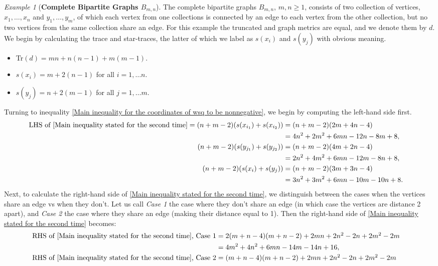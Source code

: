 \documentclass[12pt]{amsart}
\numberwithin{theorem}{section}
\theoremstyle{remark}
\newtheorem{example}[theorem]{Example}
\begin{document}
\vskip3mm
\begin{example}[{\bf Complete Bipartite Graphs $B_{m,n}$}]
The complete bipartite graphs $B_{m,n}$, $m,n\ge 1$, consists of two collection of vertices, $x_1,\dots, x_n$ and $y_1,\dots, y_m$, of which each vertex from one collections is connected by an edge to each vertex from the other collection, but no two vertices from the same collection share an edge. For this example the truncated and graph metrics are equal, and we denote them by $d$. We begin by calculating the trace and star-traces, the latter of which we label as $s(x_i)$ and $s(y_j)$ with obvious meaning. 
\begin{itemize}
\item[(i)] Tr$(d) = mn + n(n-1) + m(m-1)$. 
\item[(ii)] $s(x_i) = m + 2(n-1)$ for all $i=1,\dots n$. 
\item[\phantom{[ii]}] $s(y_j) = n + 2(m-1)$ for all $j=1,\dots m$.
\end{itemize} 
Turning to inequality \eqref{Main inequality for the coordinates of wsq to be nonnegative}, we begin by computing the left-hand side first. 
\begin{align*}
\text{LHS of \eqref{Main inequality stated for the second time}}=(n+m-2)(s(x_{i_1}) + s(x_{i_2})) & = (n+m-2)(2m+4n-4) \cr
&  =4n^2+2m^2+6mn-12n-8m+8, \cr 
(n+m-2)(s(y_{j_1}) + s(y_{j_2})) & = (n+m-2)(4m+2n-4) \cr
&  =2n^2+4m^2+6mn-12m-8n+8, \cr 
(n+m-2)(s(x_{i}) + s(y_{j})) & = (n+m-2)(3m+3n-4) \cr
&  =3n^2+3m^2+6mn-10m-10n+8. 
\end{align*}
Next, to calculate the right-hand side of \eqref{Main inequality stated for the second time}, we distinguish between the cases when the vertices share an edge vs when they don't. Let us call {\em Case 1} the case where they don't share an edge (in which case the vertices are distance 2 apart), and {\em Case 2} the case where they share an edge (making their distance equal to 1). Then the right-hand side of \eqref{Main inequality stated for the second time} becomes:
\begin{align*}
\text{RHS of \eqref{Main inequality stated for the second time}, Case 1} &\textstyle  = 2(m+n-4)(m+n-2)+  2mn + 2n^2-2n+2m^2-2m \cr
& = 4m^2+4n^2+6mn-14m-14n+16, \cr   
\text{RHS of \eqref{Main inequality stated for the second time}, Case 2} &\textstyle  = (m+n-4)(m+n-2)+  2mn+2n^2-2n+2m^2-2m \cr

\end{align*}
\end{example}
\end{document}
